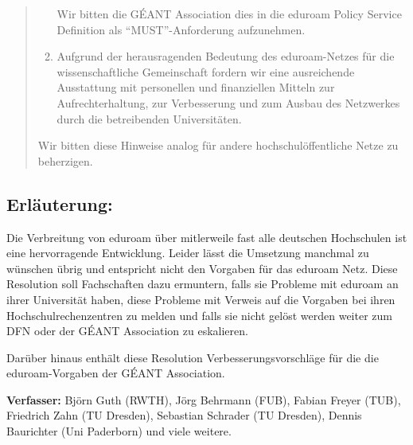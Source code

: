 \documentclass[10pt,oneside]{scrartcl}
\begin{document}
\begin{quote}
\begin{enumerate}
    Wir bitten die GÉANT Association dies in die eduroam Policy Service Definition
    als ``MUST''-Anforderung aufzunehmen.

  \item Aufgrund der herausragenden Bedeutung des eduroam-Netzes für die
    wissenschaftliche Gemeinschaft fordern wir eine ausreichende Ausstattung mit
    personellen und finanziellen Mitteln zur Aufrechterhaltung, zur Verbesserung
    und zum Ausbau des Netzwerkes durch die betreibenden Universitäten.
  \end{enumerate}

  Wir bitten diese Hinweise analog für andere hochschulöffentliche Netze zu
  beherzigen.

\end{quote}

\subsection*{Erläuterung:}

Die Verbreitung von eduroam über mitlerweile fast alle deutschen Hochschulen ist
eine hervorragende Entwicklung. Leider lässt die Umsetzung manchmal zu wünschen
übrig und entspricht nicht den Vorgaben für das eduroam Netz. Diese Resolution
soll Fachschaften dazu ermuntern, falls sie Probleme mit eduroam an ihrer
Universität haben, diese Probleme mit Verweis auf die Vorgaben bei ihren
Hochschulrechenzentren zu melden und falls sie nicht gelöst werden weiter zum DFN
oder der GÉANT Association zu eskalieren.

Darüber hinaus enthält diese Resolution Verbesserungsvorschläge für die die
eduroam-Vorgaben der GÉANT Association.

\vspace{1cm}
\textbf{Verfasser:} Björn Guth (RWTH), Jörg Behrmann (FUB), Fabian Freyer (TUB),
Friedrich Zahn (TU Dresden), Sebastian Schrader (TU Dresden), Dennis Baurichter (Uni Paderborn)
und viele weitere.
\end{document}
